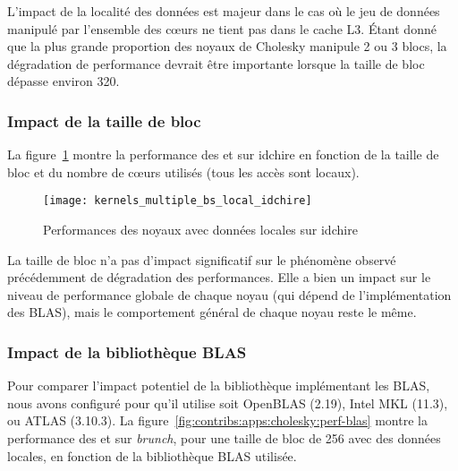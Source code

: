 

L'impact de la localité des données est majeur dans le cas où le jeu de données manipulé par l'ensemble des cœurs ne tient pas dans le cache L3.
Étant donné que la plus grande proportion des noyaux de Cholesky manipule 2 ou 3 blocs, la dégradation de performance devrait être importante lorsque la taille de bloc dépasse environ 320.




\subsubsection{Impact de la taille de bloc}

La figure~\ref{fig:contribs:apps:cholesky:perf-multiple-bs-idchire} montre la performance des \gemm et \potrf sur idchire en fonction de la taille de bloc et du nombre de cœurs utilisés (tous les accès sont locaux).

\begin{figure}[ht]
  \centering
  \texttt{[image: kernels\_multiple\_bs\_local\_idchire]}
  \caption{Performances des noyaux avec données locales sur idchire}\label{fig:contribs:apps:cholesky:perf-multiple-bs-idchire}
\end{figure}

La taille de bloc n'a pas d'impact significatif sur le phénomène observé précédemment de dégradation des performances.
Elle a bien un impact sur le niveau de performance globale de chaque noyau (qui dépend de l'implémentation des BLAS), mais le comportement général de chaque noyau reste le même.


\subsubsection{Impact de la bibliothèque BLAS}

Pour comparer l'impact potentiel de la bibliothèque implémentant les BLAS, nous avons configuré \outil pour qu'il utilise soit OpenBLAS (2.19), Intel MKL (11.3), ou ATLAS (3.10.3).
La figure~\ref{fig:contribs:apps:cholesky:perf-blas} montre la performance des \gemm et \potrf sur \emph{brunch}, pour une taille de bloc de 256 avec des données locales, en fonction de la bibliothèque BLAS utilisée.

